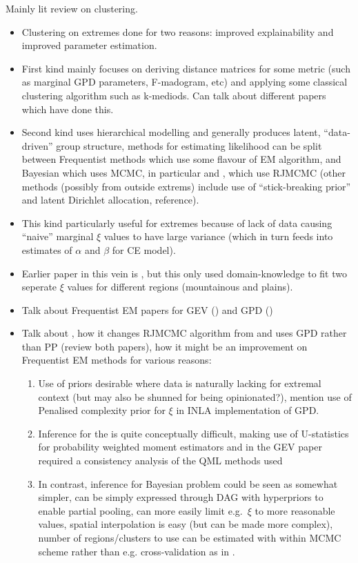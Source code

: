 \documentclass{article}
\numberwithin{equation}{section}
\begin{document}
Mainly lit review on clustering. 
\begin{itemize}
  \item Clustering on extremes done for two reasons: improved explainability and improved parameter estimation. 
  \item First kind mainly focuses on deriving distance matrices for some metric (such as marginal GPD parameters, F-madogram, etc) and applying some classical clustering algorithm such as k-mediods. Can talk about different papers which have done this.
  \item Second kind uses hierarchical modelling and generally produces latent, ``data-driven'' group structure, methods for estimating likelihood can be split between Frequentist methods which use some flavour of EM algorithm, and Bayesian which uses MCMC, in particular \cite{Bottolo2003} and  \cite{Rohrbeck2021}, which use RJMCMC (other methods (possibly from outside extrems) include use of ``stick-breaking prior'' and latent Dirichlet allocation, reference).
  \item This kind particularly useful for extremes because of lack of data causing ``naive'' marginal $\xi$ values to have large variance (which in turn feeds into estimates of $\alpha$ and $\beta$ for CE model). 
  \item Earlier paper in this vein is \cite{Cooley2007}, but this only used domain-knowledge to fit two seperate $\xi$ values for different regions (mountainous and plains).
  \item Talk about Frequentist EM papers for GEV (\cite{Dupuis2023}) and GPD (\cite{Carreau2017})
  \item Talk about \cite{Rohrbeck2021}, how it changes RJMCMC algorithm from \cite{Bottolo2003} and uses GPD rather than PP (review both papers), how it might be an improvement on Frequentist EM methods for various reasons: 
    \begin{enumerate}
      \item Use of priors desirable where data is naturally lacking for extremal context (but may also be shunned for being opinionated?), mention use of Penalised complexity prior for $\xi$ in INLA implementation of GPD. 
      \item Inference for the \cite{Carreau2017} is quite conceptually difficult, making use of U-statistics for probability weighted moment estimators and in the GEV paper required a  consistency analysis of the QML methods used
      \item In contrast, inference for Bayesian problem could be seen as somewhat simpler, can be simply expressed through DAG with hyperpriors to enable partial pooling, can more easily limit e.g.\ $\xi$ to more reasonable values, spatial interpolation is easy (but can be made more complex), number of regions/clusters to use can be estimated with within MCMC scheme rather than e.g. cross-validation as in \cite{Carreau2017}.

\end{enumerate}
\end{itemize}
\end{document}
